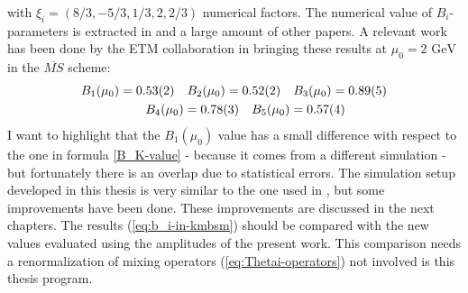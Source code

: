 \documentclass[english, LaM, oneside, noexaminfo]{sapthesis}
\newcommand{\gev}{\text{ GeV}}
\begin{document}
with $\xi_i = \left(8/3, -5/3, 1/3, 2, 2/3\right)$ numerical factors.
The numerical value of $B_i$-parameters is extracted in \cite{Bparameters} and a large amount of other papers.
A relevant work has been done by the ETM collaboration in \cite{KMBSM} bringing these results at $\mu_0 = 2\gev$ in the $\overline{MS}$ scheme:
\begin{equation}\label{eq:b_i-in-kmbsm}
    \begin{aligned}
        & B_1(\mu_0) = 0.53(2) \quad B_2(\mu_0) = 0.52(2) \quad B_3(\mu_0) = 0.89(5) \\
        & \hspace*{18mm} B_4(\mu_0) = 0.78(3) \quad B_5(\mu_0) = 0.57(4)
    \end{aligned}
\end{equation}
I want to highlight that the $B_1(\mu_0)$ value has a small difference with respect to the one in formula \ref{B_K-value} - because it comes from a different simulation - but fortunately there is an overlap due to statistical errors.
The simulation setup developed in this thesis is very similar to the one used in \cite{KMBSM}, but some improvements have been done.
These improvements are discussed in the next chapters.
\newline
The results (\ref{eq:b_i-in-kmbsm}) should be compared with the new values evaluated using the amplitudes of the present work.
This comparison needs a renormalization of mixing operators (\ref{eq:Thetai-operators}) not involved is this thesis program.

\end{document}
